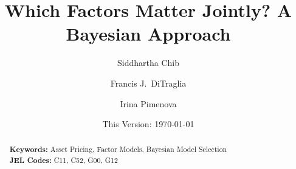 \documentclass[12pt]{article}
\begin{document}
\title{Which Factors Matter Jointly? A Bayesian Approach}
\author[1]{Siddhartha Chib}
\author[2]{Francis J.\ DiTraglia}
\author[2]{Irina Pimenova\normalsize}


\date{\small This Version: \today}
\maketitle  
\begin{abstract}
  \singlespacing
	

  	\bigskip
	\noindent\textbf{Keywords:} Asset Pricing, Factor Models, Bayesian Model Selection\\
	\medskip
  \noindent\textbf{JEL Codes:} C11, C52, G00, G12 
\end{abstract}









%
\end{document}
